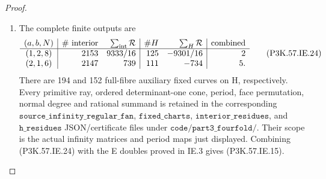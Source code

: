 \begin{proof}
\begin{enumerate}[label=\arabic*.]
\item The complete finite outputs are
\[
 \begin{array}{c|rr|rr|r}
 (a,b,N)&\#\text{ interior}&\sum_{\rm int}\mathcal R
 &\#H&\sum_H\mathcal R&\text{combined}\\ \hline
 (1,2,8)&2153&9333/16&125&-9301/16&2\\
 (2,1,6)&2147&739&111&-734&5.
 \end{array}                                             \tag{P3K.57.IE.24}
\]
There are 194 and 152 full-fibre auxiliary fixed
curves on H, respectively. Every primitive ray,
ordered determinant-one cone, period, face
permutation, normal degree and rational summand
is retained in the corresponding
\(\texttt{source\_infinity\_regular\_fan}\),
\(\texttt{fixed\_charts}\),
\(\texttt{interior\_residues}\), and
\(\texttt{h\_residues}\) JSON/certificate files
under \(\texttt{code/part3\_fourfold/}\).
Their scope is the actual infinity matrices and
period maps just displayed. Combining (P3K.57.IE.24)
with the E doubles proved in IE.3 gives (P3K.57.IE.15).

\end{enumerate}
\end{proof}